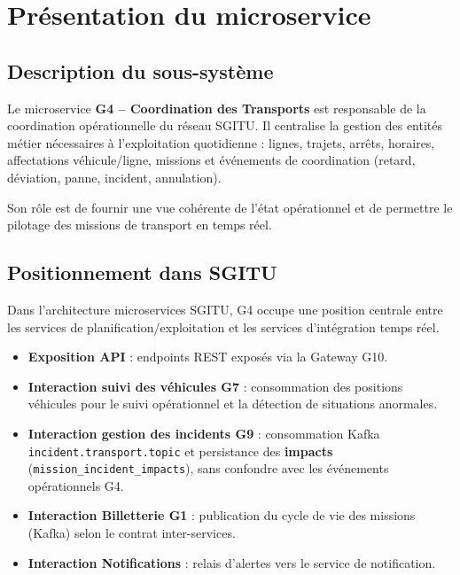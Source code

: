 \documentclass[12pt,a4paper]{report}
\begin{document}
\tableofcontents
\newpage

\chapter{Présentation du microservice}

\section{Description du sous-système}
Le microservice \textbf{G4 -- Coordination des Transports} est responsable de la
coordination opérationnelle du réseau SGITU. Il centralise la gestion des entités
métier nécessaires à l'exploitation quotidienne : lignes, trajets, arrêts,
horaires, affectations véhicule/ligne, missions et événements de coordination
(retard, déviation, panne, incident, annulation).

Son rôle est de fournir une vue cohérente de l'état opérationnel et de permettre
le pilotage des missions de transport en temps réel.

\section{Positionnement dans SGITU}
Dans l'architecture microservices SGITU, G4 occupe une position centrale entre
les services de planification/exploitation et les services d'intégration temps réel.

\begin{itemize}
  \item \textbf{Exposition API} : endpoints REST exposés via la Gateway G10.
  \item \textbf{Interaction suivi des véhicules G7} : consommation des positions véhicules pour le suivi opérationnel et la détection de situations anormales.
  \item \textbf{Interaction gestion des incidents G9} : consommation Kafka \texttt{incident.transport.topic} et persistance des \textbf{impacts} (\texttt{mission\_incident\_impacts}), sans confondre avec les événements opérationnels G4.
  \item \textbf{Interaction Billetterie G1} : publication du cycle de vie des missions (Kafka) selon le contrat inter-services.
  \item \textbf{Interaction Notifications} : relais d'alertes vers le service de notification.
\end{itemize}
\end{document}
